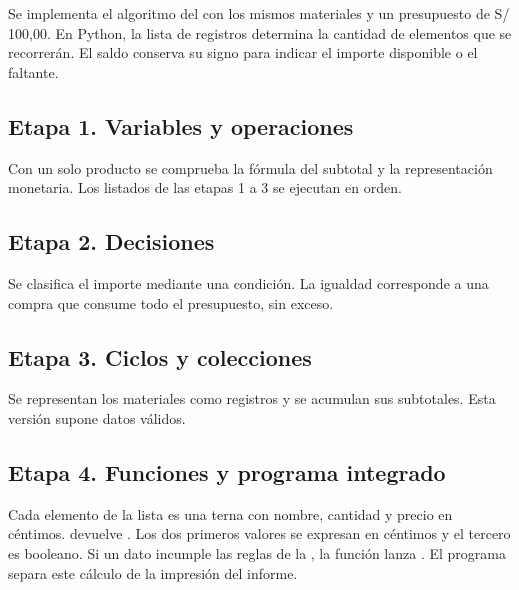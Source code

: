 Se implementa el algoritmo del  con los mismos materiales y un presupuesto de S/ 100,00. En Python, la lista de registros determina la cantidad de elementos que se recorrerán. El saldo conserva su signo para indicar el importe disponible o el faltante.



\subsection{Etapa 1. Variables y operaciones}

Con un solo producto se comprueba la fórmula del subtotal y la representación monetaria. Los listados de las etapas 1 a 3 se ejecutan en orden.


\subsection{Etapa 2. Decisiones}

Se clasifica el importe mediante una condición. La igualdad corresponde a una compra que consume todo el presupuesto, sin exceso.


\subsection{Etapa 3. Ciclos y colecciones}

Se representan los materiales como registros y se acumulan sus subtotales. Esta versión supone datos válidos.


\subsection{Etapa 4. Funciones y programa integrado}

Cada elemento de la lista es una terna con nombre, cantidad y precio en céntimos.  devuelve . Los dos primeros valores se expresan en céntimos y el tercero es booleano. Si un dato incumple las reglas de la , la función lanza . El programa separa este cálculo de la impresión del informe.

